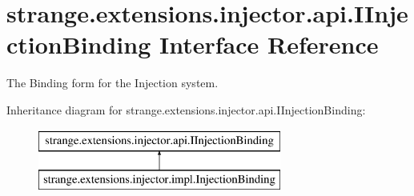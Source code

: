 \hypertarget{interfacestrange_1_1extensions_1_1injector_1_1api_1_1_i_injection_binding}{\section{strange.\-extensions.\-injector.\-api.\-I\-Injection\-Binding Interface Reference}
\label{interfacestrange_1_1extensions_1_1injector_1_1api_1_1_i_injection_binding}
}


The Binding form for the Injection system.  


Inheritance diagram for strange.\-extensions.\-injector.\-api.\-I\-Injection\-Binding\-:\begin{figure}[H]
\begin{center}
\leavevmode
\includegraphics[height=2.000000cm]{interfacestrange_1_1extensions_1_1injector_1_1api_1_1_i_injection_binding}
\end{center}
\end{figure}
